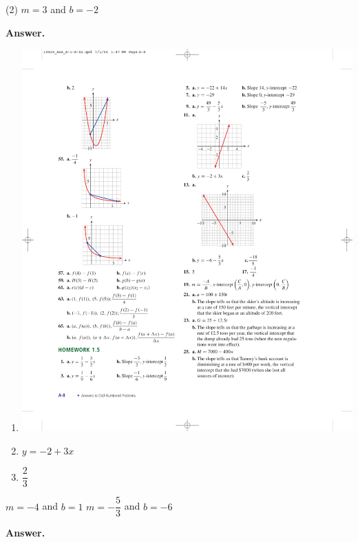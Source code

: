 \documentclass[10pt,]{book}
\theoremstyle{plain}
\theoremstyle{definition}
\theoremstyle{definition}
\theoremstyle{definition}
\theoremstyle{definition}
\numberwithin{equation}{part}
\begin{document}
\begin{exercisegroup}(2)
\exercise[11.]\hypertarget{exercise-297}{}\(m = 3\) and \(b = -2\)%
\par\smallskip
\noindent\textbf{Answer.}\hypertarget{answer-169}{}\quad
\leavevmode%
\begin{multicols}{3}
\begin{enumerate}[label=*\alph**]
\item\hypertarget{li-1162}{}\includegraphics[width=0.95\linewidth]{images/fig-ans-1-5-11}
%
\item\hypertarget{li-1163}{}\(y = -2 + 3x\)%
\item\hypertarget{li-1164}{}\(\dfrac{2}{3} \)%
\end{enumerate}
\end{multicols}
%
\exercise[12.]\hypertarget{exercise-298}{}\(m = -4\) and \(b = 1\)%
\exercise[13.]\hypertarget{exercise-299}{}\(m =-\dfrac{5}{3} \) and \(b = -6\)%
\par\smallskip
\noindent\textbf{Answer.}\hypertarget{answer-170}{}\quad
\leavevmode%
\begin{multicols}{3}
\begin{enumerate}[label=*\alph**]

\end{enumerate}
\end{multicols}
\end{exercisegroup}
\end{document}
